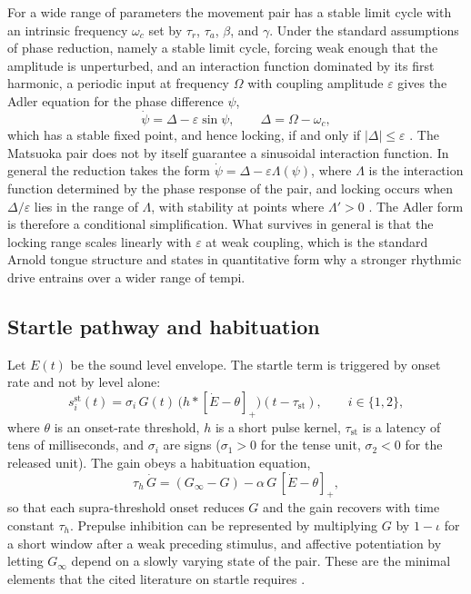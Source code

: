 \documentclass[11pt]{article}
\theoremstyle{plain}
\theoremstyle{definition}
\newcommand{\pos}[1]{\left[#1\right]_{+}}
\begin{document}
For a wide range of parameters the movement pair has a stable limit cycle with an intrinsic frequency $\omega_c$ set by $\tau_r$, $\tau_a$, $\beta$, and $\gamma$. Under the standard assumptions of phase reduction, namely a stable limit cycle, forcing weak enough that the amplitude is unperturbed, and an interaction function dominated by its first harmonic, a periodic input at frequency $\Omega$ with coupling amplitude $\varepsilon$ gives the Adler equation for the phase difference $\psi$,
\begin{equation}
\dot\psi = \Delta - \varepsilon\sin\psi, \qquad \Delta=\Omega-\omega_c,
\label{eq:adler}
\end{equation}
which has a stable fixed point, and hence locking, if and only if $|\Delta|\le\varepsilon$ \citep{pikovsky2001}. The Matsuoka pair does not by itself guarantee a sinusoidal interaction function. In general the reduction takes the form $\dot\psi=\Delta-\varepsilon\Lambda(\psi)$, where $\Lambda$ is the interaction function determined by the phase response of the pair, and locking occurs when $\Delta/\varepsilon$ lies in the range of $\Lambda$, with stability at points where $\Lambda'>0$ \citep{pikovsky2001}. The Adler form is therefore a conditional simplification. What survives in general is that the locking range scales linearly with $\varepsilon$ at weak coupling, which is the standard Arnold tongue structure and states in quantitative form why a stronger rhythmic drive entrains over a wider range of tempi.

\subsection{Startle pathway and habituation}

Let $E(t)$ be the sound level envelope. The startle term is triggered by onset rate and not by level alone:
\begin{equation}
s_i^{\mathrm{st}}(t) = \sigma_i\,G(t)\,\big(h * \pos{\dot E - \theta}\big)(t-\tau_{\mathrm{st}}), \qquad i\in\{1,2\},
\label{eq:startle}
\end{equation}
where $\theta$ is an onset-rate threshold, $h$ is a short pulse kernel, $\tau_{\mathrm{st}}$ is a latency of tens of milliseconds, and $\sigma_i$ are signs ($\sigma_1>0$ for the tense unit, $\sigma_2<0$ for the released unit). The gain obeys a habituation equation,
\begin{equation}
\tau_h\,\dot G = (G_\infty - G) - \alpha\,G\,\pos{\dot E-\theta},
\label{eq:habituation}
\end{equation}
so that each supra-threshold onset reduces $G$ and the gain recovers with time constant $\tau_h$. Prepulse inhibition can be represented by multiplying $G$ by $1-\iota$ for a short window after a weak preceding stimulus, and affective potentiation by letting $G_\infty$ depend on a slowly varying state of the pair. These are the minimal elements that the cited literature on startle requires \citep{graham1975,hoffman1980,lang1990,groves1970}.
\end{document}
